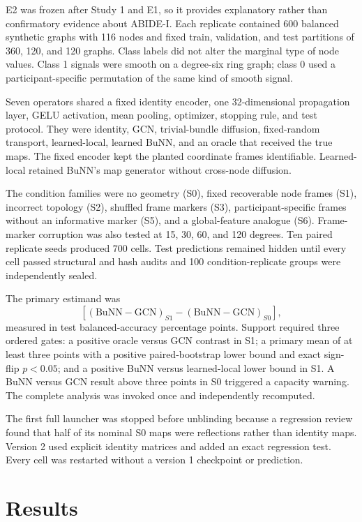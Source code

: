 \documentclass[11pt,a4paper]{article}
\begin{document}
E2 was frozen after Study 1 and E1, so it provides explanatory rather than
confirmatory evidence about ABIDE-I. Each replicate contained 600 balanced
synthetic graphs with 116 nodes and fixed train, validation, and test partitions
of 360, 120, and 120 graphs. Class labels did not alter the marginal type of
node values. Class 1 signals were smooth on a degree-six ring graph; class 0
used a participant-specific permutation of the same kind of smooth signal.

Seven operators shared a fixed identity encoder, one 32-dimensional propagation
layer, GELU activation, mean pooling, optimizer, stopping rule, and test
protocol. They were identity, GCN, trivial-bundle diffusion, fixed-random
transport, learned-local, learned BuNN, and an oracle that received the true
maps. The fixed encoder kept the planted coordinate frames identifiable.
Learned-local retained BuNN's map generator without cross-node diffusion.

The condition families were no geometry (S0), fixed recoverable node frames
(S1), incorrect topology (S2), shuffled frame markers (S3), participant-specific
frames without an informative marker (S5), and a global-feature analogue (S6).
Frame-marker corruption was also tested at 15, 30, 60, and 120 degrees. Ten
paired replicate seeds produced 700 cells. Test predictions remained hidden
until every cell passed structural and hash audits and 100 condition-replicate
groups were independently sealed.

The primary estimand was
\[
[(\mathrm{BuNN}-\mathrm{GCN})_{S1}-(\mathrm{BuNN}-\mathrm{GCN})_{S0}],
\]
measured in test balanced-accuracy percentage points. Support required three
ordered gates: a positive oracle versus GCN contrast in S1; a primary mean of
at least three points with a positive paired-bootstrap lower bound and exact
sign-flip $p<0.05$; and a positive BuNN versus learned-local lower bound in S1.
A BuNN versus GCN result above three points in S0 triggered a capacity warning.
The complete analysis was invoked once and independently recomputed.

The first full launcher was stopped before unblinding because a regression
review found that half of its nominal S0 maps were reflections rather than
identity maps. Version 2 used explicit identity matrices and added an exact
regression test. Every cell was restarted without a version 1 checkpoint or
prediction.

\section{Results}
\end{document}
